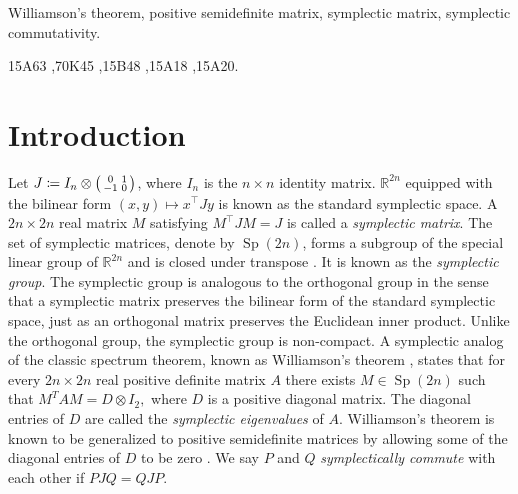 \documentclass[preprint,12pt]{elsarticle}
\begin{document}
\begin{frontmatter}
\begin{abstract}
\end{abstract}



\begin{keyword}
Williamson's theorem, positive semidefinite matrix, symplectic matrix,
symplectic commutativity.

\MSC[2020] 15A63 \sep 70K45 \sep 15B48 \sep 15A18 \sep 15A20.

\end{keyword}

\end{frontmatter}

\section{Introduction}
\label{sec:intro}

    Let $J \coloneqq I_n \otimes \begin{psmallmatrix}
        0 & 1 \\ -1 & 0
    \end{psmallmatrix}$, where $I_n$ is the $n \times n$ identity matrix.
    $\mathds{R}^{2n}$ equipped with the bilinear form $(x, y) \mapsto x^\top J y$ is known as the standard symplectic space.
    A $2n \times 2n$ real matrix $M$ satisfying $M^\top JM=J$ is called a \emph{symplectic matrix}.
    The set of symplectic matrices, denote by $\operatorname{Sp}(2n)$, forms a subgroup of the special linear group of $\mathds{R}^{2n}$ and is closed under transpose \cite{dms}.
    It is known as the \emph{symplectic group}.
    The symplectic group is analogous to the orthogonal group in the sense that a symplectic matrix preserves the bilinear form of the standard symplectic space, just as an orthogonal matrix preserves the Euclidean inner product.
    Unlike the orthogonal group, the symplectic group is non-compact.
    \sloppy A symplectic analog of the classic spectrum theorem, known as Williamson's theorem \cite{williamson1936algebraic}, states that for every $2n \times 2n$ real positive definite matrix $A$ there exists $M \in \operatorname{Sp}(2n)$ such that $M^T A M = D \otimes I_2,$ where $D$ is a positive diagonal matrix.
    The diagonal entries of $D$ are called the \emph{symplectic eigenvalues} of $A$.
    Williamson's theorem is known to be generalized to positive semidefinite matrices by allowing some of the diagonal entries of $D$ to be zero \cite{jm, sonstykel}.
    We say $P$ and $Q$ \emph{symplectically commute} with each other if $PJQ=QJP$.
    
\end{document}
